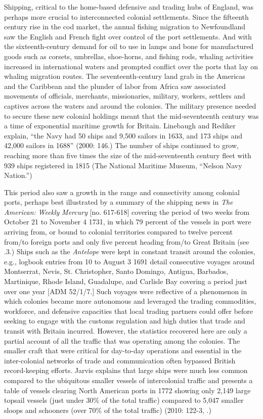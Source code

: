 Shipping, critical to the home-based defensive and trading hubs of England, was perhaps more crucial to interconnected colonial settlements. Since the fifteenth century rise in the cod market, the annual fishing migration to Newfoundland saw the English and French fight over control of the port settlements. And with the sixteenth-century demand for oil to use in lamps and bone for manufactured goods such as corsets, umbrellas, shoe-horns, and fishing rods, whaling activities increased in international waters and prompted conflict over the ports that lay on whaling migration routes. The seventeenth-century land grab in the Americas and the Caribbean and the plunder of labor from Africa saw associated movements of officials, merchants, missionaries, military, workers, settlers and captives across the waters and around the colonies. The military presence needed to secure these new colonial holdings meant that the mid-seventeenth century was a time of exponential maritime growth for Britain. Linebaugh and Rediker explain, “the Navy had 50 ships and 9,500 sailors in 1633, and 173 ships and 42,000 sailors in 1688” (2000: 146.)  The number of ships continued to grow, reaching more than five times the size of the mid-seventeenth century fleet with 939 ships registered in 1815 (The National Maritime Museum, “Nelson Navy Nation.”) 

This period also saw a growth in the range and connectivity among colonial ports, perhaps best illustrated by a summary of the shipping news in \textit{The} \textit{American:} \textit{Weekly} \textit{Mercury} [no. 617-618] covering the period of two weeks from October 21 to November 4 1731, in which 79 percent of the vessels in port were arriving from, or bound to colonial territories compared to twelve percent from/to foreign ports and only five percent heading from/to Great Britain (see .3.) Ships such as the \textit{Antelope} were kept in constant transit around the colonies, e.g., logbook entries from 10 \citealt{June1690} to August 3 1691 detail consecutive voyages around Montserrat, Nevis, St. Christopher, Santo Domingo, Antigua, Barbados, Martinique, Rhode Island, Guadalupe, and Carlisle Bay covering a period just over one year [ADM 52/1/7.] Such voyages were reflective of a phenomenon in which colonies became more autonomous and leveraged the trading commodities, workforce, and defensive capacities that local trading partners could offer before seeking to engage with the customs regulation and high duties that trade and transit with Britain incurred. However, the statistics recovered here are only a partial account of all the traffic that was operating among the colonies. The smaller craft that were critical for day-to-day operations and essential in the inter-colonial networks of trade and communication often bypassed British record-keeping efforts. Jarvis explains that large ships were much less common compared to the ubiquitous smaller vessels of intercolonial traffic and presents a table of vessels clearing North American ports in 1772 showing only 2,149 large topsail vessels (just under 30\% of the total traffic) compared to 5,047 smaller sloops and schooners (over 70\% of the total traffic) (2010: 122-3, .) 

